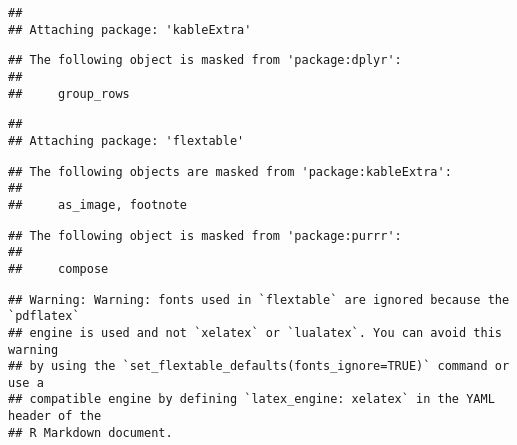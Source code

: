 \documentclass[
]{article}
\begin{document}
\begin{verbatim}
## 
## Attaching package: 'kableExtra'
\end{verbatim}

\begin{verbatim}
## The following object is masked from 'package:dplyr':
## 
##     group_rows
\end{verbatim}

\begin{verbatim}
## 
## Attaching package: 'flextable'
\end{verbatim}

\begin{verbatim}
## The following objects are masked from 'package:kableExtra':
## 
##     as_image, footnote
\end{verbatim}

\begin{verbatim}
## The following object is masked from 'package:purrr':
## 
##     compose
\end{verbatim}

\begin{verbatim}
## Warning: Warning: fonts used in `flextable` are ignored because the `pdflatex`
## engine is used and not `xelatex` or `lualatex`. You can avoid this warning
## by using the `set_flextable_defaults(fonts_ignore=TRUE)` command or use a
## compatible engine by defining `latex_engine: xelatex` in the YAML header of the
## R Markdown document.
\end{verbatim}

\providecommand{\docline}[3]{\noalign{\global\setlength{\arrayrulewidth}{#1}}\arrayrulecolor[HTML]{#2}\cline{#3}}

\setlength{\tabcolsep}{2pt}

\renewcommand*{\arraystretch}{1.5}
\end{document}
